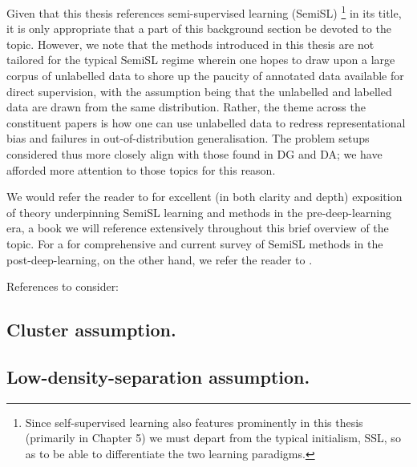 Given that this thesis references semi-supervised learning (SemiSL)
\footnote{
Since self-supervised learning also features prominently in this thesis (primarily in Chapter 5) we
must depart from the typical initialism, SSL, so as to be able to differentiate the two learning
paradigms.
}
in its title, it is only appropriate that a part of this background section be devoted to the
topic.
%
However, we note that the methods introduced in this thesis are not tailored for the typical SemiSL
regime wherein one hopes to draw upon a large corpus of unlabelled data to shore up the paucity of
annotated data available for direct supervision, with the assumption being that the unlabelled and
labelled data are drawn from the same distribution.
%
Rather, the theme across the constituent papers is how one can use unlabelled data to redress
representational bias and failures in out-of-distribution generalisation. 
%
The problem setups considered thus more closely align with those found in DG and DA; we have
afforded more attention to those topics for this reason.

We would refer the reader to \cite{chapelle2009semi} for excellent (in both clarity and depth)
exposition of theory underpinning SemiSL learning and methods in the pre-deep-learning era, a book
we will reference extensively throughout this brief overview of the topic.
%
For a for comprehensive and current survey of SemiSL methods in the post-deep-learning, on the
other hand, we refer the reader to \cite{yang2022survey}.

%
References to consider:
\cite{chapelle2009semi, scholkopf2021toward, lienen2021credal, sohn2020fixmatch, tarvainen2017mean,
blum1998combining, gong2021alphamatch}
%

\subsection{Cluster assumption.}\label{ssec:cluster_assumption}
%
\subsection{Low-density-separation assumption.}\label{ssec:lds_assumption}
%
